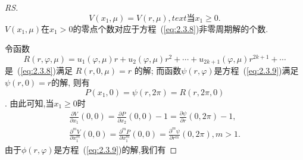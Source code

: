 \begin{proof}[RS]
\begin{equation}
  \label{eq:2.3.11}
V\left(x_{1}, \mu\right)=V(r, \mu),text{当}x_{1} \geqslant 0.
\end{equation}
$V\left(x_{1}, \mu\right)$在$x_{1}>0$的零点个数对应于方程~(\ref{eq:2.3.8})非零周期解的个数.
\par
令函数
$$
R(r, \varphi, \mu)=u_{1}(\varphi, \mu) r+u_{2}(\varphi, \mu) r^{2}+\cdots+u_{2 k+1}(\varphi, \mu) r^{2 k+1}+\cdots
$$
是~(\ref{eq:2.3.8})满足
$
R(r, 0, \mu)=r
$
的解;
而函数$\psi(r, \varphi)$是方程~(\ref{eq:2.3.9})满足$\psi(r, 0)=r$的解,
则有
$$P\left(x_{1}, 0\right)=\psi(r, 2 \pi)=R(r, 2 \pi, 0)$$.
由此可知,当$x_{1} \geqslant 0$时
\begin{align}
  \label{eq:2.3.12}
  \frac{\partial V}{\partial x_{1}}(0,0)=\frac{\partial P}{\partial x_{2}}(0,0)-1=\frac{\partial \psi}{\partial r}(0,2 \pi)-1,\\
  \frac{\partial^{m} V}{\partial x_{1}^{m}}(0,0)=\frac{\partial^{m} P}{\partial x_{1}^{m}}(0,0)=\frac{\partial^{m} \psi}{\partial r^{m}}(0,2 \pi), m>1.
\end{align}
由于$\phi(r, \varphi)$是方程~(\ref{eq:2.3.9})的解,我们有


\end{proof}
